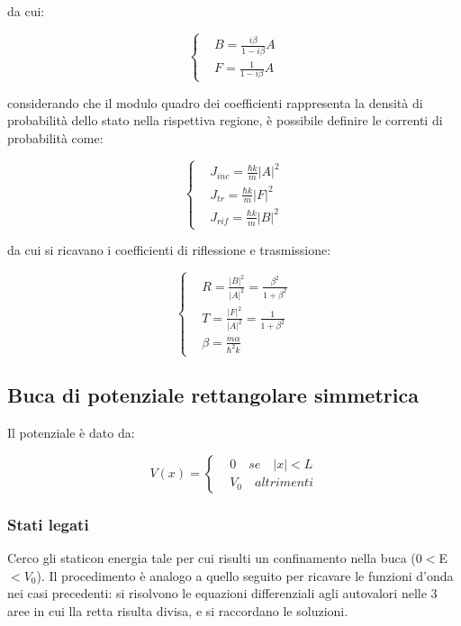 \documentclass{article}
\begin{document}
da cui:

\begin{equation}
    \left\{
    \begin{aligned}
         & B= \frac{i\beta}{1-i\beta}A \\
         & F= \frac{1}{1-i\beta}A
    \end{aligned}
    \right.
\end{equation}

considerando che il modulo quadro dei coefficienti rappresenta la densità di probabilità dello stato nella rispettiva regione,
è possibile definire le correnti di probabilità come:

\begin{equation}
    \left\{
    \begin{aligned}
         & J_{inc}= \frac{\hbar k}{m}|A|^2 \\
         & J_{tr}= \frac{\hbar k}{m}|F|^2  \\
         & J_{rif}= \frac{\hbar k}{m}|B|^2
    \end{aligned}
    \right.
\end{equation}

da cui si ricavano i coefficienti di riflessione e trasmissione:

\begin{equation}
    \left\{
    \begin{aligned}
         & R= \frac{|B|^2}{|A|^2}= \frac{\beta^2}{1+\beta^2} \\
         & T= \frac{|F|^2}{|A|^2}= \frac{1}{1+\beta^2}       \\
         & \beta= \frac{m\alpha}{\hbar^2k}
    \end{aligned}
    \right.
\end{equation}

\subsection{Buca di potenziale rettangolare simmetrica}

Il potenziale è dato da:

\begin{equation}
    V(x)=
    \left\{
    \begin{aligned}
         & 0 \quad se \quad |x|<L \\
         & V_0 \quad altrimenti
    \end{aligned}
    \right.
\end{equation}

\subsubsection{Stati legati}
Cerco gli staticon energia tale per cui risulti un confinamento nella buca (0$<$E$<V_0$).
Il procedimento è analogo a quello seguito per ricavare le funzioni d'onda nei casi precedenti:
si risolvono le equazioni differenziali agli autovalori nelle 3 aree in cui lla retta risulta divisa, e si raccordano
le soluzioni.
\end{document}
